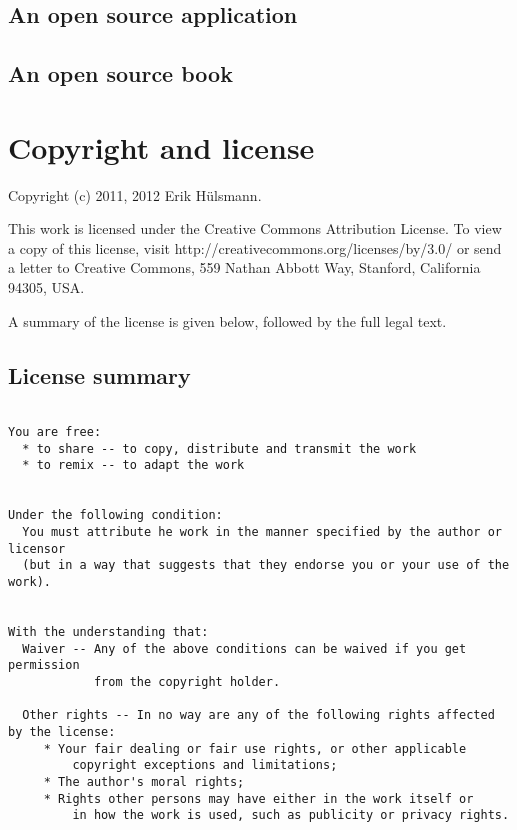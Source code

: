 \section{An open source application}

\section{An open source book}


\chapter{Copyright and license}

Copyright (c) 2011, 2012 Erik H\"ulsmann.


This work is licensed under the Creative Commons Attribution License.
To view a copy of this license, visit http://creativecommons.org/licenses/by/3.0/
or send a letter to Creative Commons, 559 Nathan Abbott Way,
Stanford, California 94305, USA.

A summary of the license is given below, followed by the full legal text.

\section{License summary}

\begin{verbatim}

You are free:
  * to share -- to copy, distribute and transmit the work
  * to remix -- to adapt the work


Under the following condition:
  You must attribute he work in the manner specified by the author or licensor
  (but in a way that suggests that they endorse you or your use of the work).


With the understanding that:
  Waiver -- Any of the above conditions can be waived if you get permission
            from the copyright holder.
  
  Other rights -- In no way are any of the following rights affected by the license:
     * Your fair dealing or fair use rights, or other applicable 
         copyright exceptions and limitations;
     * The author's moral rights;
     * Rights other persons may have either in the work itself or
         in how the work is used, such as publicity or privacy rights.



\end{verbatim}




